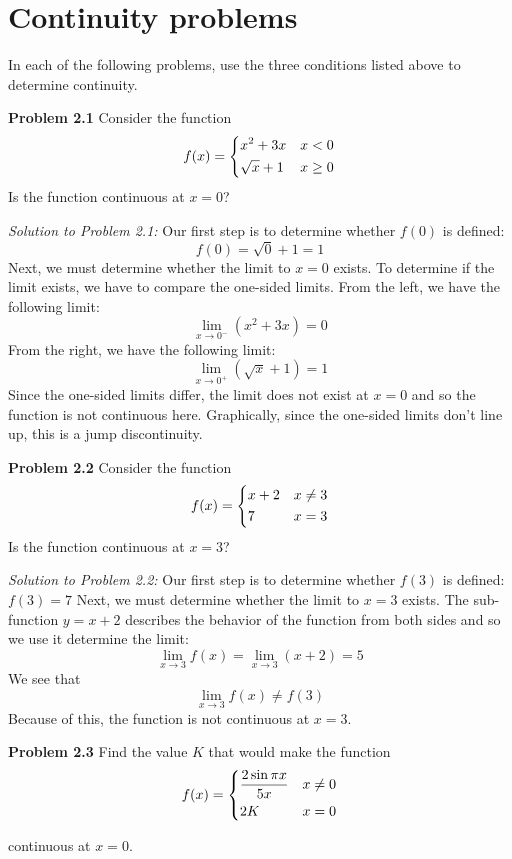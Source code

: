 \documentclass[11pt]{scrartcl}
\begin{document}
\section{Continuity problems}
\noindent 
In each of the following problems, use the three conditions listed above to determine continuity. 


\begin{tcolorbox}
[colback=purple!5!white,colframe=purple!75!black]
\textbf{Problem 2.1} Consider the function 
\[
   f(x)= \begin{dcases}
        x^2+3x & x<0 \\
        \sqrt x +1 & x \geq 0
       
    \end{dcases}
\]
\noindent 
Is the function continuous at $x=0$\:?
\end{tcolorbox}
\noindent
\textit{Solution to Problem 2.1:} Our first step is to determine whether $f(0)$ is defined: 
$$f(0)=\sqrt{0}+1=1$$
\noindent 
Next, we must determine whether the limit to $x=0$ 
exists. To determine if the limit exists, we have to compare the one-sided limits. From the left, we have the following limit: 
$$\lim_{x \to 0^{-}} (x^2+3x)=0$$
From the right, we have the following limit: 
$$\lim_{x \to 0^{+}} (\sqrt x +1)=1$$
Since the one-sided limits differ, the limit does not exist at $x=0$ and so the function is not continuous here. Graphically, since the one-sided limits don't line up, this is a jump discontinuity.\\
\begin{tcolorbox}
[colback=purple!5!white,colframe=purple!75!black]
\textbf{Problem 2.2} Consider the function 
\[
   f(x)= \begin{dcases}
        x+2 & x \neq 3\\
        7 & x = 3
       
    \end{dcases}
\]
\noindent 
Is the function continuous at $x=3$?
\end{tcolorbox}
\noindent
\textit{Solution to Problem 2.2:} Our first step is to determine whether $f(3)$ is defined: 
$f(3)=7$
\noindent 
Next, we must determine whether the limit to $x=3$ exists. The sub-function $y=x+2$ describes the behavior of the function from both sides and so we use it determine the limit: 
$$\lim_{x \to 3} f(x)=\lim_{x \to 3} (x+2)=5$$
We see that 
$$\lim_{x \to 3} f(x)\neq f(3)$$
Because of this, the function is not continuous at $x=3$. \\
\begin{tcolorbox}
[colback=purple!5!white,colframe=purple!75!black]
\textbf{Problem 2.3} Find the value $K$ that would make the function
$$ f(x)= \begin{dcases}
        \frac{2\sin \pi x}{5x} & x \neq 0 \\
         2K & x = 0
       
    \end{dcases}
$$

continuous at $x=0$.
\end{tcolorbox}
\end{document}
